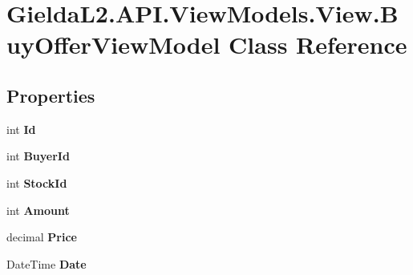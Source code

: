 \hypertarget{class_gielda_l2_1_1_a_p_i_1_1_view_models_1_1_view_1_1_buy_offer_view_model}{}\section{Gielda\+L2.\+A\+P\+I.\+View\+Models.\+View.\+Buy\+Offer\+View\+Model Class Reference}
\label{class_gielda_l2_1_1_a_p_i_1_1_view_models_1_1_view_1_1_buy_offer_view_model}
\subsection*{Properties}
\begin{DoxyCompactItemize}
\item 
\mbox{\label{class_gielda_l2_1_1_a_p_i_1_1_view_models_1_1_view_1_1_buy_offer_view_model_a362aacc23355eef1a4d2943cf9059315}} 
int {\bfseries Id}
\item 
\mbox{\label{class_gielda_l2_1_1_a_p_i_1_1_view_models_1_1_view_1_1_buy_offer_view_model_a95f632890d10bdb2239cfd963f7b49f8}} 
int {\bfseries Buyer\+Id}
\item 
\mbox{\label{class_gielda_l2_1_1_a_p_i_1_1_view_models_1_1_view_1_1_buy_offer_view_model_a37038963cd1e0a6bf2e7e40d87311b16}} 
int {\bfseries Stock\+Id}
\item 
\mbox{\label{class_gielda_l2_1_1_a_p_i_1_1_view_models_1_1_view_1_1_buy_offer_view_model_ac654a7a6961b45b0a164f5c3bdfa00c1}} 
int {\bfseries Amount}
\item 
\mbox{\label{class_gielda_l2_1_1_a_p_i_1_1_view_models_1_1_view_1_1_buy_offer_view_model_a2a5416ad56b0fdc351b6aa4ab2607ec7}} 
decimal {\bfseries Price}
\item 
\mbox{\label{class_gielda_l2_1_1_a_p_i_1_1_view_models_1_1_view_1_1_buy_offer_view_model_ada2be83af01ba13017549cb60d8f858a}} 
Date\+Time {\bfseries Date}
\end{DoxyCompactItemize}


